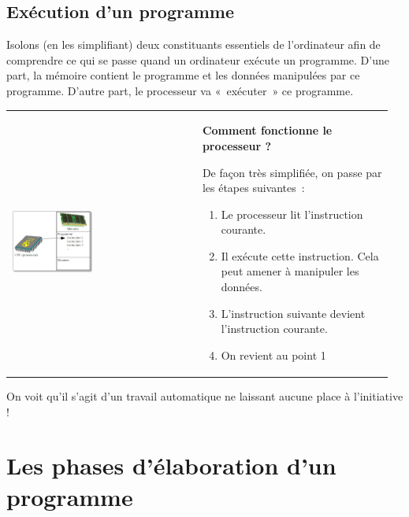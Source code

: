 	\subsection{Exécution d'un programme}

		Isolons (en les simplifiant) deux constituants essentiels de
		l'ordinateur afin de comprendre ce qui se passe quand
		un ordinateur exécute un programme. D'une part, la
		mémoire contient le programme et les données manipulées par ce
		programme. D'autre part, le processeur va «~exécuter~»
		ce programme.

		\begin{tabular}{m{0.48\linewidth}m{0.48\linewidth}}
			\begin{center}
			\includegraphics[width=0.45\textwidth]{image/intro-schema-ordi}
			\end{center}
		&
			\textbf{Comment fonctionne le processeur ?}
	
			De façon très simplifiée, on passe par les étapes suivantes~:
	
			\medskip
			\begin{flushleft}
			\begin{enumerate}
			\item Le processeur lit l'instruction courante.
			\item Il exécute cette instruction. Cela peut amener à manipuler les données.
			\item L'instruction suivante devient l'instruction courante.
			\item On revient au point 1
			\end{enumerate}
			\end{flushleft}
		\\
		\end{tabular}

		On voit qu'il s'agit d'un travail
		automatique ne laissant aucune place à l'initiative !

\section{Les phases d'élaboration d'un programme}

